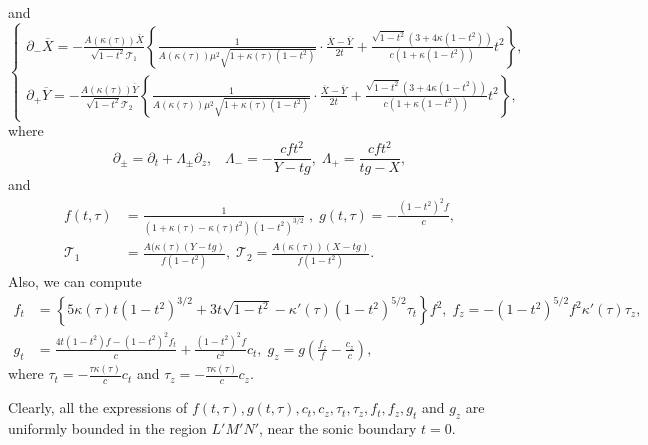 \documentclass[3p,11pt]{elsarticle}
\numberwithin{equation}{section}
\begin{document}
and
\begin{equation}\label{Sol1_8a}
\begin{cases}
\partial_- \overline{X} = -\frac{A(\kappa(\tau))\overline X}{\sqrt{1-t^2}\mathcal{T}_1} \left\{\frac{1}{A(\kappa(\tau))\mu^2\sqrt{1+\kappa(\tau)(1-t^2)}}\cdot\frac{\overline X- \overline Y}{2t}+\frac{\sqrt{1-t^2}(3+4\kappa(1-t^2))}{c(1+\kappa(1-t^2))}t^2\right\},\\
\partial_+ \overline{Y} =-\frac{A(\kappa(\tau)) \overline Y}{\sqrt{1-t^2}\mathcal{T}_2} \left\{\frac{1}{A(\kappa(\tau))\mu^2\sqrt{1+\kappa(\tau)(1-t^2)}}\cdot\frac{\overline X- \overline Y}{2t}+\frac{\sqrt{1-t^2}(3+4\kappa(1-t^2))}{c(1+\kappa(1-t^2))}t^2\right\},
\end{cases}
\end{equation}
where
\begin{equation*}\label{Sol1_9}
\partial_\pm = \partial_t + \Lambda_{\pm}\partial_z, \;\;\;\Lambda_- = -\frac{cft^2}{ Y-tg}, \; \Lambda_+ = \frac{cft^2}{tg-X},
\end{equation*}
and
\begin{equation}\label{Sol1_10}
\begin{split}
    f(t,\tau) &=\frac{1}{(1+\kappa(\tau)-\kappa(\tau)t^2)(1-t^2)^{3/2}}\;, \; g(t,\tau) = -\frac{(1-t^2)^2f}{c},\\
    \mathcal{T}_1 &= \frac{A(\kappa(\tau)(Y-tg)}{f(1-t^2)},\;%
    \mathcal{T}_2 = \frac{A(\kappa(\tau))(X-tg)}{f(1-t^2)}.
\end{split}
\end{equation}
Also, we can compute
\begin{equation*}\label{Sol1_11}
    \begin{split}
        f_t&=\left\{5\kappa(\tau)t(1-t^2)^{3/2}+3t\sqrt{1-t^2}-\kappa'(\tau)(1-t^2)^{5/2}\tau_t \right\}f^2, \; f_z=-(1-t^2)^{5/2}f^2\kappa'(\tau)\tau_z,\\
        g_t&=\frac{4t(1-t^2)f-(1-t^2)^2f_t}{c}+\frac{(1-t^2)^2f}{c^2}c_t,\; g_z=g\left(\frac{f_z}{f}-\frac{c_z}{c}\right),
    \end{split}
\end{equation*}
where $\tau_t=-\frac{\tau\kappa(\tau)}{c}c_t$ and $\tau_z=-\frac{\tau\kappa(\tau)}{c}c_z$.

Clearly, all the expressions of $f(t,\tau),g(t,\tau),c_t,c_z,\tau_t,\tau_z,f_t,f_z,g_t$ and $g_z$ are uniformly bounded in the region $L'M'N'$, near the sonic boundary $t=0$.
\end{document}
